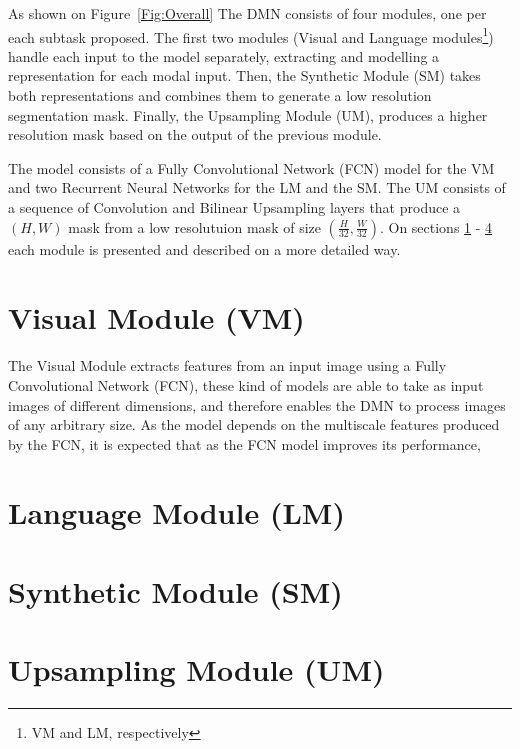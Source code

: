 As shown on Figure~\ref{Fig:Overall} The DMN consists of four modules, one per each subtask proposed. The first two modules (Visual and Language modules\footnote{VM and LM, respectively}) handle each input to the model separately, extracting and modelling a representation for each modal input. Then, the Synthetic Module (SM) takes both representations and combines them to generate a low resolution segmentation mask. Finally, the Upsampling Module (UM), produces a higher resolution mask based on the output of the previous module.

The model consists of a Fully Convolutional Network (FCN) model for the VM and two Recurrent Neural Networks for the LM and the SM. The UM consists of a sequence of Convolution and Bilinear Upsampling layers that produce a $(H, W)$ mask from a low resolutuion mask of size $(\frac{H}{32}, \frac{W}{32})$. On sections \ref{section:vm} - \ref{section:um} each module is presented and described on a more detailed way.

\section{Visual Module (VM)}
\label{section:vm}
The Visual Module extracts features from an input image using a Fully Convolutional Network (FCN), these kind of models are able to take as input images of different dimensions, and therefore enables the DMN to process images of any arbitrary size. As the model depends on the multiscale features produced by the FCN, it is expected that as the FCN model improves its performance, 

\section{Language Module (LM)}

\section{Synthetic Module (SM)}

\section{Upsampling Module (UM)}
\label{section:um}